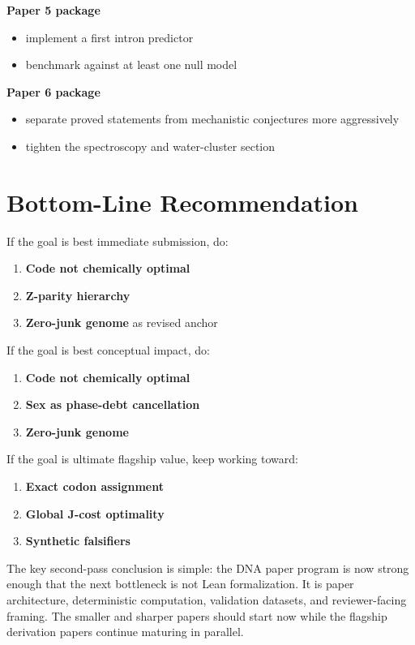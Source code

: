 \documentclass[11pt]{article}
\begin{document}
\textbf{Paper 5 package}
\begin{itemize}
\item implement a first intron predictor
\item benchmark against at least one null model
\end{itemize}

\textbf{Paper 6 package}
\begin{itemize}
\item separate proved statements from mechanistic conjectures more aggressively
\item tighten the spectroscopy and water-cluster section
\end{itemize}

\section*{Bottom-Line Recommendation}
If the goal is best immediate submission, do:
\begin{enumerate}
\item \textbf{Code not chemically optimal}
\item \textbf{Z-parity hierarchy}
\item \textbf{Zero-junk genome} as revised anchor
\end{enumerate}

If the goal is best conceptual impact, do:
\begin{enumerate}
\item \textbf{Code not chemically optimal}
\item \textbf{Sex as phase-debt cancellation}
\item \textbf{Zero-junk genome}
\end{enumerate}

If the goal is ultimate flagship value, keep working toward:
\begin{enumerate}
\item \textbf{Exact codon assignment}
\item \textbf{Global J-cost optimality}
\item \textbf{Synthetic falsifiers}
\end{enumerate}

The key second-pass conclusion is simple: the DNA paper program is now strong enough that the next bottleneck is not Lean formalization. It is paper architecture, deterministic computation, validation datasets, and reviewer-facing framing. The smaller and sharper papers should start now while the flagship derivation papers continue maturing in parallel.
\end{document}
